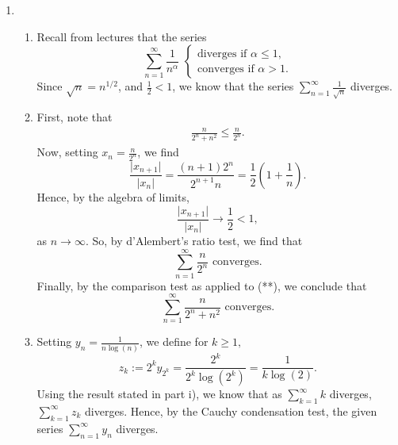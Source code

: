 \documentclass[
  12pt,
  a4paper]{extarticle}
\providecommand{\tightlist}{%
  \setlength{\itemsep}{0pt}\setlength{\parskip}{0pt}}
\theoremstyle{plain}
\theoremstyle{definition}
\theoremstyle{plain}
\theoremstyle{plain}
\theoremstyle{plain}
\theoremstyle{plain}
\theoremstyle{definition}
\theoremstyle{definition}
\theoremstyle{remark}
\theoremstyle{remark}
\renewcommand{\;}{\,}
\begin{document}
\begin{enumerate}
\begin{enumerate}
  \end{enumerate}
\item
  \begin{enumerate}
  \def\labelenumii{\roman{enumii})}
  \tightlist
  \item
    Recall from lectures that the series \[\sum_{n=1}^{\infty} \frac{1}{n^{\alpha}}\;\;\begin{cases}\text{diverges if}\;\; \alpha \leq 1,\\
    \text{converges if}\;\; \alpha > 1.
    \end{cases}\] Since \(\sqrt{n} = n^{1/2}\), and \(\frac{1}{2}<1\), we know that the series \(\sum_{n=1}^{\infty}\frac{1}{\sqrt{n}}\) diverges.
  \item
    First, note that
    \begin{align}
    \frac{n}{2^n + n^2} \leq \frac{n}{2^n}.\tag{**}
    \end{align}
    Now, setting \(x_n = \frac{n}{2^n}\), we find \[\frac{\lvert x_{n+1}\rvert}{\lvert x_n \rvert} = \frac{(n+1)2^n}{2^{n+1}n} = \frac{1}{2}\left(1 + \frac{1}{n}\right).\] Hence, by the algebra of limits, \[\frac{\lvert x_{n+1}\rvert}{\lvert x_n \rvert} \to \frac{1}{2} < 1,\] as \(n \to \infty\). So, by d'Alembert's ratio test, we find that \[\sum_{n=1}^{\infty}\frac{n}{2^n} \; \; \text{converges.}\] Finally, by the comparison test as applied to (**), we conclude that \[\sum_{n=1}^{\infty}\frac{n}{2^n + n^2} \; \; \text{converges.}\]
  \item
    Setting \(y_n = \frac{1}{n\log(n)}\), we define for \(k \geq 1,\) \[z_{k}:= 2^k y_{2^k} = \frac{2^k}{2^k\log(2^k)} = \frac{1}{k\log(2)}.\] Using the result stated in part i), we know that as \(\sum_{k=1}^{\infty}k\) diverges, \(\sum_{k=1}^{\infty} z_k\) diverges. Hence, by the Cauchy condensation test, the given series \(\sum_{n=1}^{\infty}y_n\) diverges.
  \end{enumerate}
\end{enumerate}
\end{document}
